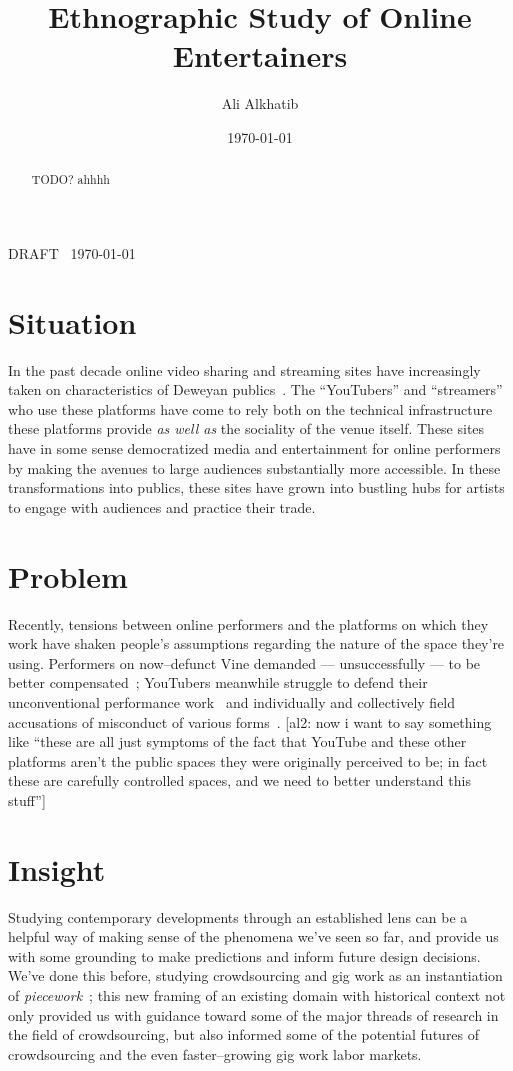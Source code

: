 \documentclass[10pt]{article}
\title{Ethnographic Study of Online Entertainers}
\author{Ali Alkhatib}
\date{\today}
\makeatletter
\def\maketitle{%
\par{\centering {\scshape \huge \textbf{\@title}}%
\par{\@author}
\par{DRAFT \DTMcurrenttime~\today}%
\par}}
\newcommand{\ali}[1]{{\color{Red}[al2: #1]}}
\newcommand{\topic}[1]{{\color{Blue}#1}}
\makeatother
\begin{document}
  \maketitle
  \begin{abstract}
  TODO? ahhhh
  \end{abstract}



\section*{Situation}
\topic{In the past decade
online video sharing %
and streaming sites %
have increasingly taken on characteristics of
Deweyan publics~\cite{dewey2012public,disalvo2009design}.}
The ``YouTubers'' and ``streamers'' who use these platforms have come to rely both on
the technical infrastructure these platforms provide \textit{as well as}
the sociality of the venue itself.
These sites have in some sense democratized media and entertainment for online performers by
making the avenues to large audiences substantially more accessible.
In these transformations into publics, these sites
have grown into bustling hubs for artists to engage with audiences and practice their trade.

\section*{Problem}
\topic{Recently, tensions between online performers and the platforms on which they work have shaken people's
assumptions regarding the nature of the space they're using.}
Performers on now--defunct Vine demanded --- unsuccessfully --- to be better compensated~\cite{vineWantsMoney,vineInsiderMeeting};
YouTubers meanwhile struggle to defend their unconventional performance work~\cite{h3h3Lawsuit}
and individually and collectively field accusations of misconduct of various forms~\cite{youtubeDramaResponses}.
\ali{now i want to say something like
``these are all just symptoms of the fact that YouTube and these other platforms aren't the public spaces they were originally perceived to be;
in fact these are carefully controlled spaces, and we need to better understand this stuff''}

\section*{Insight}
\topic{Studying contemporary developments through an established lens can be a helpful way of
making sense of the phenomena we've seen so far, and
provide us with some grounding to make predictions and inform future design decisions.}
We've done this before, studying crowdsourcing and gig work as
an instantiation of \textit{piecework}~\cite{pieceworkCrowdworkGigwork};
this new framing of an existing domain with historical context not only
provided us with guidance toward some of the major threads of research
in the field of crowdsourcing, but
also informed some of the potential futures of crowdsourcing and
the even faster--growing gig work labor markets.
\end{document}
